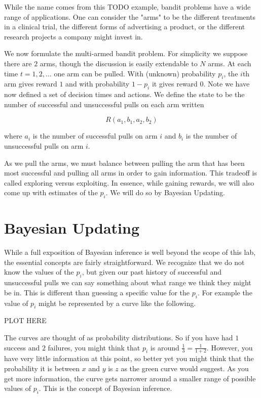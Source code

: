 While the name comes from this TODO example, bandit problems have a wide range of applications.  One can consider the "arms" to be the different treatments in a clinical trial, the different forms of advertising a product, or the different research projects a company might invest in.

We now formulate the multi-armed bandit problem.  For simplicity we suppose there are $2$ arms, though the discussion is easily extendable to $N$ arms.  At each time $t= 1,2,\ldots$ one arm can be pulled.  With (unknown) probability $p_i$, the $i$th arm gives reward $1$ and with probability $1-p_i$ it gives reward $0$.  Note we have now defined a set of decision times and actions.  We define the state to be the number of successful and unsuccessful pulls on each arm written

\begin{equation}\label{state}
R(a_1,b_1,a_2,b_2)
\end{equation}

where $a_i$ is the number of successful pulls on arm $i$ and $b_i$ is the number of unsuccessful pulls on arm $i$.

As we pull the arms, we must balance between pulling the arm that has been most successful and pulling all arms in order to gain information.  This tradeoff is called exploring versus exploiting.  In essence, while gaining rewards, we will also come up with estimates of the $p_i$.  We will do so by Bayesian Updating.

\section*{Bayesian Updating}
While a full exposition of Bayesian inference is well beyond the scope of this lab, the essential concepts are fairly straightforward.  We recognize that we do not know the values of the $p_i$, but given our past history of successful and unsuccessful pulls we can say something about what range we think they might be in. This is different than guessing a specific value for the $p_i$.  For example the value of $p_i$ might be represented by a curve like the following.

PLOT HERE

The curves are thought of as probability distributions.  So if you have had $1$ success and $2$ failures, you might think that $p_i$ is around $\frac{1}{3} = \frac{1}{1+2}$. However, you have very little information at this point, so better yet you might think that the probability it is between $x$ and $y$ is $z$ as the green curve would suggest.  As you get more information, the curve gets narrower around a smaller range of possible values of $p_i$.  This is the concept of Bayesian inference.  

